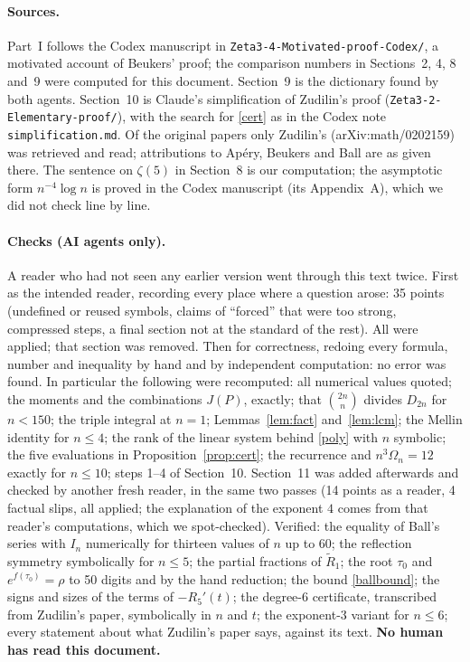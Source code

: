 \documentclass[11pt]{article}
\theoremstyle{remark}
\begin{document}
\paragraph{Sources.} Part~I follows the Codex manuscript in
\texttt{Zeta3-4-Motivated-proof-Codex/}, a motivated account of Beukers' proof; the comparison
numbers in Sections~2, 4, 8 and~9 were computed for this document. Section~9 is the dictionary
found by both agents. Section~10 is Claude's simplification of Zudilin's proof
(\texttt{Zeta3-2-Elementary-proof/}), with the search for \eqref{cert} as in the Codex note
\texttt{simplification.md}. Of the original papers only Zudilin's (arXiv:math/0202159) was
retrieved and read; attributions to Ap\'ery, Beukers and Ball are as given there. The sentence on
$\zeta(5)$ in Section~8 is our computation; the asymptotic form $n^{-4}\log n$ is proved in the
Codex manuscript (its Appendix~A), which we did not check line by line.

\paragraph{Checks (AI agents only).} A reader who had not seen any earlier version went through
this text twice. First as the intended reader, recording every place where a question arose: 35
points (undefined or reused symbols, claims of ``forced'' that were too strong, compressed steps, a
final section not at the standard of the rest). All were applied; that section was removed. Then
for correctness, redoing every formula, number and inequality by hand and by independent
computation: no error was found. In particular the following were recomputed: all numerical values
quoted; the moments and the combinations $J(P)$, exactly; that $\binom{2n}n$ divides $D_{2n}$ for
$n<150$; the triple integral at $n=1$; Lemmas~\ref{lem:fact} and~\ref{lem:lcm}; the Mellin identity
for $n\le4$; the rank of the linear system behind \eqref{poly} with $n$ symbolic; the five
evaluations in Proposition~\ref{prop:cert}; the recurrence and $n^3\Omega_n=12$ exactly for
$n\le10$; steps 1--4 of Section~10. Section~11 was added afterwards and checked by another fresh reader, in the same two passes
(14 points as a reader, 4 factual slips, all applied; the explanation of the exponent $4$ comes from
that reader's computations, which we spot-checked). Verified: the equality of Ball's series with
$I_n$ numerically for thirteen values of $n$ up to $60$; the reflection symmetry symbolically for
$n\le5$; the partial fractions of $\widetilde R_1$; the root $\tau_0$ and $e^{f(\tau_0)}=\rho$ to 50
digits and by the hand reduction; the bound \eqref{ballbound}; the signs and sizes of the terms of
$-R_5'(t)$; the degree-$6$ certificate, transcribed from Zudilin's paper, symbolically in $n$ and
$t$; the exponent-$3$ variant for $n\le6$; every statement about what Zudilin's paper says, against
its text.
\textbf{No human has read this document.}
\end{document}
